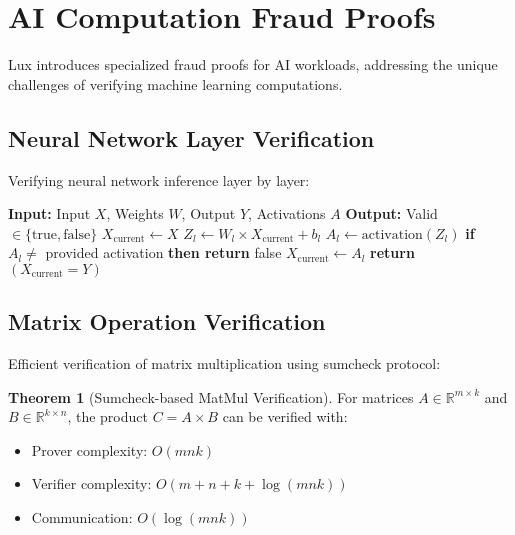 \documentclass[11pt,a4paper]{article}
\theoremstyle{definition}
\newtheorem{theorem}{Theorem}[section]
\begin{document}
\section{AI Computation Fraud Proofs}

Lux introduces specialized fraud proofs for AI workloads, addressing the unique challenges of verifying machine learning computations.

\subsection{Neural Network Layer Verification}

Verifying neural network inference layer by layer:

\begin{algorithm}
\caption{Layer-wise Neural Network Verification}
\begin{algorithmic}[1]
\State \textbf{Input:} Input $X$, Weights $W$, Output $Y$, Activations $A$
\State \textbf{Output:} Valid $\in \{\text{true}, \text{false}\}$
\State $X_{\text{current}} \gets X$
    \State $Z_l \gets W_l \times X_{\text{current}} + b_l$
    \State $A_l \gets \text{activation}(Z_l)$
    \State \textbf{if} $A_l \neq$ provided activation \textbf{then return} false
    \State $X_{\text{current}} \gets A_l$
\EndFor
\State \textbf{return} $(X_{\text{current}} = Y)$
\end{algorithmic}
\end{algorithm}

\subsection{Matrix Operation Verification}

Efficient verification of matrix multiplication using sumcheck protocol:

\begin{theorem}[Sumcheck-based MatMul Verification]
For matrices $A \in \mathbb{R}^{m \times k}$ and $B \in \mathbb{R}^{k \times n}$, the product $C = A \times B$ can be verified with:
\begin{itemize}
    \item Prover complexity: $O(mnk)$
    \item Verifier complexity: $O(m + n + k + \log(mnk))$
    \item Communication: $O(\log(mnk))$
\end{itemize}
\end{theorem}
\end{document}
